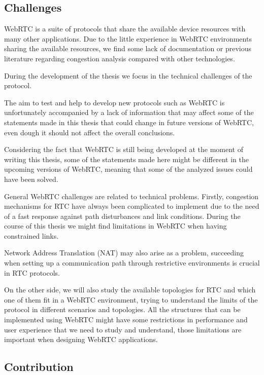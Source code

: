 \subsection{Challenges}

WebRTC is a suite of protocols that share the available device resources with many other applications. Due to the little experience in WebRTC environments sharing the available resources, we find some lack of documentation or previous literature regarding congestion analysis compared with other technologies. 

During the development of the thesis we focus in the technical challenges of the protocol.

The aim to test and help to develop new protocols such as WebRTC is unfortunately accompanied by a lack of information that may affect some of the statements made in this thesis that could change in future versions of WebRTC, even dough it should not affect the overall conclusions.

Considering the fact that WebRTC is still being developed at the moment of writing this thesis, some of the statements made here might be different in the upcoming versions of WebRTC, meaning that some of the analyzed issues could have been solved.

General WebRTC challenges are related to technical problems. Firstly, congestion mechanisms for RTC have always been complicated to implement due to the need of a fast response against path disturbances and link conditions. During the course of this thesis we might find limitations in WebRTC when having constrained links.

Network Address Translation (NAT)  may also arise as a problem, succeeding when setting up a communication path through restrictive environments is crucial in RTC protocols.

On the other side, we will also study the available topologies for RTC and which one of them fit in a WebRTC environment, trying to understand the limits of the protocol in different scenarios and topologies. All the structures that can be implemented using WebRTC might have some restrictions in performance and user experience that we need to study and understand, those limitations are important when designing WebRTC applications.

\subsection{Contribution}

